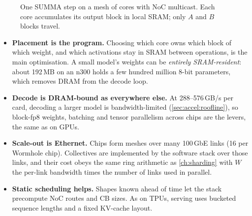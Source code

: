 \begin{figure}[t]
\centering
{}
\caption{One SUMMA step on a mesh of cores with NoC multicast. Each core accumulates its output block
in local SRAM; only $A$ and $B$ blocks travel.}
\label{fig:accel:summa}
\end{figure}

\begin{systemslens}
\begin{itemize}
  \item \textbf{Placement is the program.} Choosing which core owns which block of which weight,
    and which activations stay in SRAM between operations, is the main optimisation. A small model's
    weights can be \emph{entirely SRAM-resident}: about 192\,MB on an n300 holds a few hundred million
    8-bit parameters, which removes DRAM from the decode loop.
  \item \textbf{Decode is DRAM-bound as everywhere else.} At 288--576\,GB/s per card, decoding a
    larger model is bandwidth-limited (\cref{sec:accel:roofline}), so block-fp8 weights, batching
    and tensor parallelism across chips are the levers, the same as on GPUs.
  \item \textbf{Scale-out is Ethernet.} Chips form meshes over many 100\,GbE links (16 per
    Wormhole chip). Collectives are implemented by the software stack over those links, and their
    cost obeys the same ring arithmetic as \cref{ch:sharding} with $W$ the per-link bandwidth times
    the number of links used in parallel.
  \item \textbf{Static scheduling helps.} Shapes known ahead of time let the stack precompute NoC
    routes and CB sizes. As on TPUs, serving uses bucketed sequence lengths and a fixed KV-cache
    layout.
\end{itemize}
\end{systemslens}

